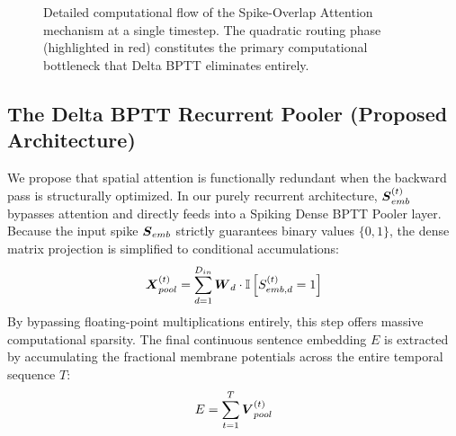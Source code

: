 \documentclass[10pt,a4paper,twoside]{article}
\begin{document}
\begin{figure}[t!]
\begin{center}
{%
}
\caption{Detailed computational flow of the Spike-Overlap Attention mechanism at a single timestep. The quadratic routing phase (highlighted in red) constitutes the primary computational bottleneck that Delta BPTT eliminates entirely.}
\label{fig:attention_mech}
\end{center}
\end{figure}


\subsection{The Delta BPTT Recurrent Pooler (Proposed Architecture)}
We propose that spatial attention is functionally redundant when the backward pass is structurally optimized. In our purely recurrent architecture, $\boldsymbol{S}_{emb}^{(t)}$ bypasses attention and directly feeds into a Spiking Dense BPTT Pooler layer. Because the input spike $\boldsymbol{S}_{emb}$ strictly guarantees binary values $\{0, 1\}$, the dense matrix projection is simplified to conditional accumulations:
\begin{equation}
\boldsymbol{X}_{pool}^{(t)} = \sum_{d=1}^{D_{in}} \boldsymbol{W}_{d} \cdot \mathbb{I}\left[ S_{emb, d}^{(t)} = 1 \right]
\end{equation}
By bypassing floating-point multiplications entirely, this step offers massive computational sparsity. The final continuous sentence embedding $E$ is extracted by accumulating the fractional membrane potentials across the entire temporal sequence $T$:
\begin{equation}
E = \sum_{t=1}^T \boldsymbol{V}_{pool}^{(t)}
\end{equation}
\end{document}
